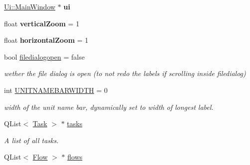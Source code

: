 \begin{DoxyCompactItemize}
\item 
\hypertarget{class_main_window_a35466a70ed47252a0191168126a352a5}{}\hyperlink{class_ui_1_1_main_window}{Ui\+::\+Main\+Window} $\ast$ {\bfseries ui}\label{class_main_window_a35466a70ed47252a0191168126a352a5}

\item 
\hypertarget{class_main_window_abe042bf7fb79319c77c2e2aeea0cd3e6}{}float {\bfseries vertical\+Zoom} = 1\label{class_main_window_abe042bf7fb79319c77c2e2aeea0cd3e6}

\item 
\hypertarget{class_main_window_a75d4db6cf3737249d72aa1cb2859b424}{}float {\bfseries horizontal\+Zoom} = 1\label{class_main_window_a75d4db6cf3737249d72aa1cb2859b424}

\item 
\hypertarget{class_main_window_abc95ad5dca40c75507cea7914b3f9fab}{}bool \hyperlink{class_main_window_abc95ad5dca40c75507cea7914b3f9fab}{filedialogopen} = false\label{class_main_window_abc95ad5dca40c75507cea7914b3f9fab}

\begin{DoxyCompactList}\small\item\em wether the file dialog is open (to not redo the labels if scrolling inside filedialog) \end{DoxyCompactList}\item 
\hypertarget{class_main_window_a3da16704d1445e1885bf6c72cdc88066}{}int \hyperlink{class_main_window_a3da16704d1445e1885bf6c72cdc88066}{U\+N\+I\+T\+N\+A\+M\+E\+B\+A\+R\+W\+I\+D\+T\+H} = 0\label{class_main_window_a3da16704d1445e1885bf6c72cdc88066}

\begin{DoxyCompactList}\small\item\em width of the unit name bar, dynamically set to width of longest label. \end{DoxyCompactList}\item 
\hypertarget{class_main_window_ab302362b256360d527a628bdbfcde171}{}Q\+List$<$ \hyperlink{struct_task}{Task} $>$ $\ast$ \hyperlink{class_main_window_ab302362b256360d527a628bdbfcde171}{tasks}\label{class_main_window_ab302362b256360d527a628bdbfcde171}

\begin{DoxyCompactList}\small\item\em A list of all tasks. \end{DoxyCompactList}\item 
\hypertarget{class_main_window_a843068e01d54730258357a4bc5f29bac}{}Q\+List$<$ \hyperlink{struct_flow}{Flow} $>$ $\ast$ \hyperlink{class_main_window_a843068e01d54730258357a4bc5f29bac}{flows}\label{class_main_window_a843068e01d54730258357a4bc5f29bac}


\end{DoxyCompactItemize}
